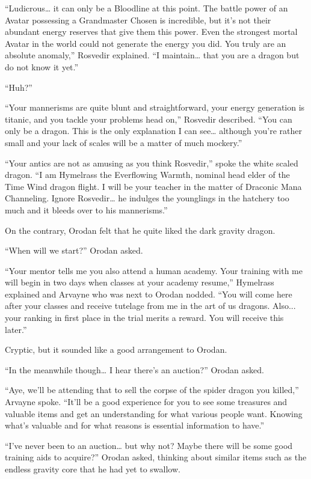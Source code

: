 \documentclass[a4paper,10pt]{book}
\begin{document}
“Ludicrous… it can only be a Bloodline at this point. The battle power of an Avatar possessing a Grandmaster Chosen is incredible, but it’s not their abundant energy reserves that give them this power. Even the strongest mortal Avatar in the world could not generate the energy you did. You truly are an absolute anomaly,” Rosvedir explained. “I maintain… that you are a dragon but do not know it yet.”\par
“Huh?”\par
“Your mannerisms are quite blunt and straightforward, your energy generation is titanic, and you tackle your problems head on,” Rosvedir described. “You can only be a dragon. This is the only explanation I can see… although you’re rather small and your lack of scales will be a matter of much mockery.”\par
“Your antics are not as amusing as you think Rosvedir,” spoke the white scaled dragon. “I am Hymelrass the Everflowing Warmth, nominal head elder of the Time Wind dragon flight. I will be your teacher in the matter of Draconic Mana Channeling. Ignore Rosvedir… he indulges the younglings in the hatchery too much and it bleeds over to his mannerisms.”\par
On the contrary, Orodan felt that he quite liked the dark gravity dragon.\par
“When will we start?” Orodan asked.\par
“Your mentor tells me you also attend a human academy. Your training with me will begin in two days when classes at your academy resume,” Hymelrass explained and Arvayne who was next to Orodan nodded. “You will come here after your classes and receive tutelage from me in the art of us dragons. Also... your ranking in first place in the trial merits a reward. You will receive this later.”\par
Cryptic, but it sounded like a good arrangement to Orodan.\par
“In the meanwhile though… I hear there’s an auction?” Orodan asked.\par
“Aye, we’ll be attending that to sell the corpse of the spider dragon you killed,” Arvayne spoke. “It’ll be a good experience for you to see some treasures and valuable items and get an understanding for what various people want. Knowing what’s valuable and for what reasons is essential information to have.”\par
“I’ve never been to an auction… but why not? Maybe there will be some good training aids to acquire?” Orodan asked, thinking about similar items such as the endless gravity core that he had yet to swallow.\par
\end{document}
